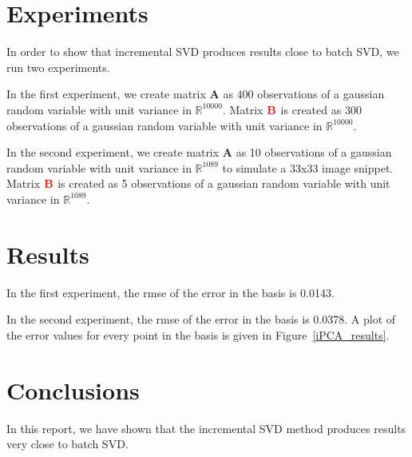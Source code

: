 \cite{2008_JNL_subspaceTRK_Ross}

\section{Experiments}
In order to show that incremental SVD produces results close to batch SVD, we run two experiments.

In the first experiment, we create matrix $\mathbf{A}$ as 400 observations of a gaussian random variable with unit variance in $\mathbb{R}^{10000}$.  Matrix ${\color{red}\mathbf{B}}$ is created as 300 observations of a gaussian random variable with unit variance in $\mathbb{R}^{10000}$.  

In the second experiment, we create matrix $\mathbf{A}$ as 10 observations of a gaussian random variable with unit variance in $\mathbb{R}^{1089}$ to simulate a 33x33 image snippet.  Matrix ${\color{red}\mathbf{B}}$ is created as 5 observations of a gaussian random variable with unit variance in $\mathbb{R}^{1089}$. 



\section{Results}
In the first experiment, the rmse of the error in the basis is 0.0143.

In the second experiment, the rmse of the error in the basis is 0.0378.  A plot of the error values for every point in the basis is given in Figure~\ref{iPCA_results}.




\section{Conclusions}
In this report, we have shown that the incremental SVD method produces results very close to batch SVD.




